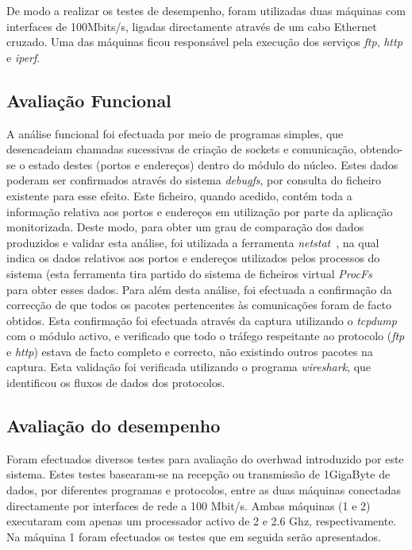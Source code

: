 \documentclass[a4paper]{llncs}
\newcommand{\td}[1]{\todo[inline]{#1}}
\begin{document}

De modo a realizar os testes de desempenho, foram utilizadas duas máquinas com interfaces de 100Mbits/s, ligadas directamente através de um cabo Ethernet cruzado. Uma das máquinas ficou responsável pela execução dos serviços \textit{ftp}, \textit{http} e \textit{iperf}.

\subsection{Avaliação Funcional}
A análise funcional foi efectuada por meio de programas simples, que desencadeiam chamadas sucessivas de criação de sockets e comunicação, obtendo-se o estado destes (portos e endereços) dentro do módulo do núcleo. Estes dados poderam ser confirmados através do sistema \textit{debugfs}, por consulta do ficheiro existente para esse efeito. Este ficheiro, quando acedido, contém toda a informação relativa aos portos e endereços em utilização por parte da aplicação monitorizada.
Deste modo, para obter um grau de comparação dos dados produzidos e validar esta análise, foi utilizada a ferramenta \textit{netstat}~\cite{netstat}, na qual indica os dados relativos aos portos e endereços utilizados pelos processos do sistema (esta ferramenta tira partido do sistema de ficheiros virtual \textit{ProcFs} ~\cite{procfskernel} para obter esses dados.
Para além desta análise, foi efectuada a confirmação da correcção de que todos os pacotes pertencentes às comunicações foram de facto obtidos. Esta confirmação foi efectuada através da captura utilizando o \textit{tcpdump} com o módulo activo, e verificado que todo o tráfego respeitante ao protocolo (\textit{ftp} e \textit{http}) estava de facto completo e correcto, não existindo outros pacotes na captura. Esta validação foi verificada utilizando o programa \textit{wireshark}, que identificou os fluxos de dados dos protocolos.

\subsection{Avaliação do desempenho}
Foram efectuados diversos testes para avaliação do overhwad introduzido por este sistema. Estes testes basearam-se na recepção ou transmissão de 1GigaByte de dados, por diferentes programas e protocolos, entre as duas máquinas conectadas directamente por interfaces de rede a 100 Mbit/s. Ambas máquinas (1 e 2) executaram com apenas um processador activo de 2 e 2.6 Ghz, respectivamente. Na máquina 1 foram efectuados os testes que em seguida serão apresentados.
\end{document}
